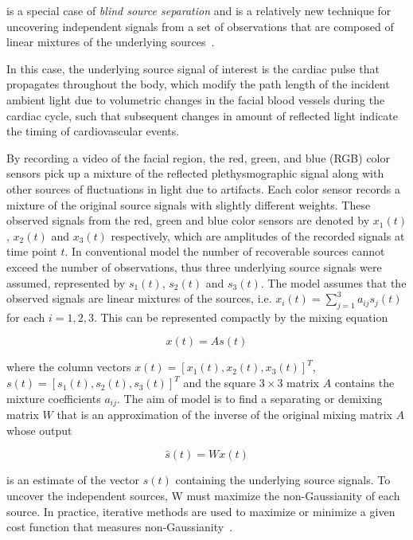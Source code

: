 \ica{} is a special case of \emph{blind source separation} and is a relatively 
new technique for uncovering independent signals from a set of observations 
that are composed of linear mixtures of the underlying 
sources~\cite{Comon1994Independent}.

In this case, the underlying source signal of interest is the cardiac pulse
that propagates throughout the body, which modify the path length of the 
incident ambient light due to volumetric changes in the facial blood vessels
during the cardiac cycle, such that subsequent changes in amount of reflected
light indicate the timing of cardiovascular events.

By recording a video of 
the facial region, the red, green, and blue (RGB) color sensors pick up a 
mixture of the reflected plethysmographic signal along with other sources of 
fluctuations in light due to artifacts. Each color sensor records a mixture 
of the original source signals with slightly different weights. These observed 
signals from the red, green and blue color sensors are denoted by $x_{1}(t)$,
$x_{2}(t)$ and $x_{3}(t)$ respectively, which are amplitudes of the recorded 
signals at time point $t$. In conventional \ica{} model the number of 
recoverable sources cannot exceed the number of observations, thus three 
underlying source signals were assumed, represented by $s_{1}(t)$, $s_{2}(t)$ 
and $s_{3}(t)$. The \ica{} model assumes that the observed signals are linear 
mixtures of the sources, i.e. $x_{i}(t) = \sum_{j=1}^{3} a_{ij} s_{j}(t)$ for 
each $i=1,2,3$. This can be represented compactly by the mixing equation

\begin{equation}
  x(t) = As(t)
\end{equation}

where the column vectors $x(t) = [x_{1}(t), x_{2}(t), x_{3}(t)]^{T}$, 
$s(t) = [s_{1}(t), s_{2}(t), s_{3}(t)]^{T}$ and the square $3\times3$ 
matrix $A$ contains the mixture coefficients $a_{ij}$. The aim of \ica{} model 
is to find a separating or demixing matrix $W$ that is an approximation of the 
inverse of the original mixing matrix $A$ whose output

\begin{equation}
  \hat{s}(t) = Wx(t)
\end{equation}

is an estimate of the vector $s(t)$ containing the underlying source signals. 
To uncover the independent sources, W must maximize the non-Gaussianity of 
each source. In practice, iterative methods are used to maximize or minimize 
a given cost function that measures non-Gaussianity~\cite{Poh2010Non, 
Poh2011Advancements}.

